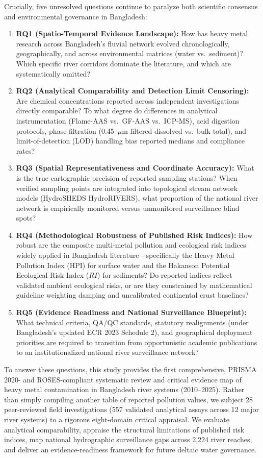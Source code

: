\documentclass[authoryear,preprint,12pt]{elsarticle}
\begin{document}
Crucially, five unresolved questions continue to paralyze both scientific consensus and environmental governance in Bangladesh:
\begin{enumerate}
    \item \textbf{RQ1 (Spatio-Temporal Evidence Landscape):} How has heavy metal research across Bangladesh's fluvial network evolved chronologically, geographically, and across environmental matrices (water vs.\ sediment)? Which specific river corridors dominate the literature, and which are systematically omitted?
    \item \textbf{RQ2 (Analytical Comparability and Detection Limit Censoring):} Are chemical concentrations reported across independent investigations directly comparable? To what degree do differences in analytical instrumentation (Flame-AAS vs.\ GF-AAS vs.\ ICP-MS), acid digestion protocols, phase filtration (0.45~$\mu\text{m}$ filtered dissolved vs.\ bulk total), and limit-of-detection (LOD) handling bias reported medians and compliance rates?
    \item \textbf{RQ3 (Spatial Representativeness and Coordinate Accuracy):} What is the true cartographic precision of reported sampling stations? When verified sampling points are integrated into topological stream network models (HydroSHEDS HydroRIVERS), what proportion of the national river network is empirically monitored versus unmonitored surveillance blind spots?
    \item \textbf{RQ4 (Methodological Robustness of Published Risk Indices):} How robust are the composite multi-metal pollution and ecological risk indices widely applied in Bangladesh literature---specifically the Heavy Metal Pollution Index ($\mathrm{HPI}$) for surface water and the Hakanson Potential Ecological Risk Index ($RI$) for sediments? Do reported indices reflect validated ambient ecological risks, or are they constrained by mathematical guideline weighting damping and uncalibrated continental crust baselines?
    \item \textbf{RQ5 (Evidence Readiness and National Surveillance Blueprint):} What technical criteria, QA/QC standards, statutory realignments (under Bangladesh's updated ECR 2023 Schedule 2), and geographical deployment priorities are required to transition from opportunistic academic publications to an institutionalized national river surveillance network?
\end{enumerate}

To answer these questions, this study provides the first comprehensive, PRISMA 2020- and ROSES-compliant systematic review and critical evidence map of heavy metal contamination in Bangladesh river systems (2010--2025). Rather than simply compiling another table of reported pollution values, we subject 28 peer-reviewed field investigations (557 validated analytical assays across 12 major river systems) to a rigorous eight-domain critical appraisal. We evaluate analytical comparability, appraise the structural limitations of published risk indices, map national hydrographic surveillance gaps across 2,224 river reaches, and deliver an evidence-readiness framework for future deltaic water governance.
\end{document}
